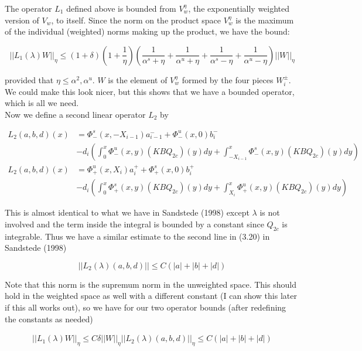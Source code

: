 \documentclass[12pt]{article}
\begin{document}
The operator $L_1$ defined above is bounded from $V_w^\eta$, the exponentially weighted version of $V_w$, to itself. Since the norm on the product space $V_w^\eta$ is the maximum of the individual (weighted) norms making up the product, we have the bound:

\begin{equation}
	||L_1(\lambda)W||_\eta \leq (1 + \delta)\left(1 + \frac{1}{\eta}\right)\left(\frac{1}{\alpha^s + \eta} + \frac{1}{\alpha^u + \eta} + \frac{1}{\alpha^s - \eta} + \frac{1}{\alpha^u - \eta}\right)||W||_\eta
\end{equation}

provided that $\eta \leq \alpha^2, \alpha^u$. $W$ is the element of $V_w^\eta$ formed by the four pieces $W_i^\pm$. We could make this look nicer, but this shows that we have a bounded operator, which is all we need.\\

Now we define a second linear operator $L_2$ by

\begin{align*}
L_2(a, b, d)(x) &= \Phi^s_-(x, -X_{i-1})a^-_{i-1} + \Phi^u_-(x, 0)b_i^- \\
&-d_i \left( \int_0^x \Phi^u_-(x, y)(KBQ_{2c})(y) dy  + \int_{-X_{i-1}}^x \Phi^s_-(x, y)(KBQ_{2c})(y) dy \right)\\
L_2(a, b, d)(x) &= \Phi^u_+(x, X_i)a^+_{i} + \Phi^s_+(x, 0)b_i^+ \\
&-d_i \left( \int_0^x \Phi^s_+(x, y)(KBQ_{2c})(y) dy + \int_{X_{i}}^x \Phi^u_+(x, y)(KBQ_{2c})(y) dy \right)
\end{align*}

This is almost identical to what we have in Sandstede (1998) except $\lambda$ is not involved and the term inside the integral is bounded by a constant since $Q_{2c}$ is integrable. Thus we have a similar estimate to the second line in (3.20) in Sandstede (1998)

\[
||L_2(\lambda)(a, b, d)|| \leq C(|a| + |b| + |d|)
\]

Note that this norm is the supremum norm in the unweighted space. This should hold in the weighted space as well with a different constant (I can show this later if this all works out), so we have for our two operator bounds (after redefining the constants as needed)

\begin{align*}
||L_1(\lambda)W||_\eta \leq C \delta ||W||_\eta
||L_2(\lambda)(a, b, d)||_\eta \leq C(|a| + |b| + |d|)
\end{align*}
\end{document}
